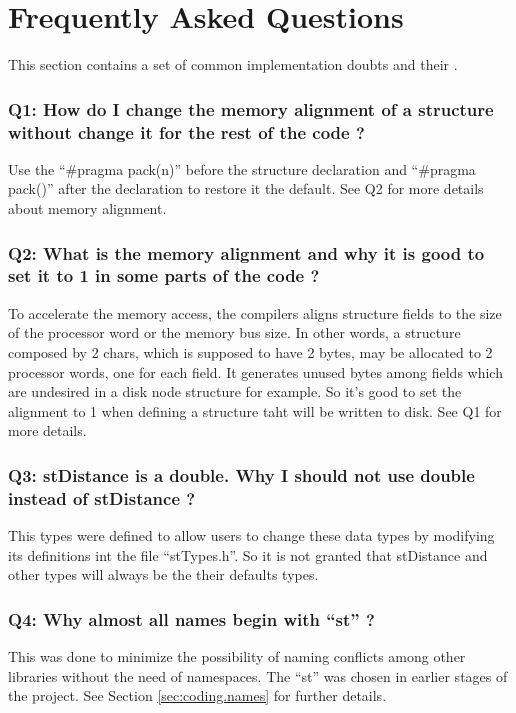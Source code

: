 \section{Frequently Asked Questions}
\label{sec:coding.faq}

This section contains a set of common implementation doubts and their .

\subsubsection{Q1: How do I change the memory alignment of a structure without change it for the rest of the code ?}
Use the ``\#pragma pack(n)'' before the structure declaration and ``\#pragma pack()'' after the declaration to restore it the default. See Q2 for more details about memory alignment.

\subsubsection{Q2: What is the memory alignment and why it is good to set it to 1 in some parts of the code ?}
To accelerate the memory access, the compilers aligns structure fields to the size of the processor word or  the memory bus size. In other words, a structure composed by 2 chars, which is supposed to have 2 bytes, may be allocated to 2 processor words, one for each field. It generates unused bytes among fields which are undesired in a disk node structure for example. So it's good to set the alignment to 1 when defining a structure taht will be written to disk. See Q1 for more details.

\subsubsection{Q3: stDistance is a double. Why I should not use double instead of stDistance ?}
This types were defined to allow users to change these data types by modifying its definitions int the file ``stTypes.h''. So it is not granted that stDistance and other types will always be the their defaults types.

\subsubsection{Q4: Why almost all \libname names begin with ``st'' ?}
This was done to minimize the possibility of naming conflicts among other libraries without the need of namespaces. The ``st'' was chosen in earlier stages of the project. See Section \ref{sec:coding.names} for further details.

